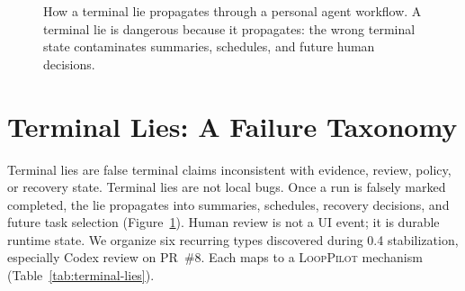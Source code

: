 \documentclass[11pt]{article}
\newcommand{\looppilot}{\textsc{LoopPilot}}
\begin{document}
\begin{figure}[t]
  \centering
  \caption{How a terminal lie propagates through a personal agent workflow.
  A terminal lie is dangerous because it propagates: the wrong terminal state contaminates summaries, schedules, and future human decisions.}
  \label{fig:lie-propagation}
\end{figure}

\section{Terminal Lies: A Failure Taxonomy}
\label{sec:taxonomy}

Terminal lies are false terminal claims inconsistent with evidence, review, policy, or recovery state.
Terminal lies are not local bugs.
Once a run is falsely marked completed, the lie propagates into summaries, schedules, recovery decisions, and future task selection (Figure~\ref{fig:lie-propagation}).
Human review is not a UI event; it is durable runtime state.
We organize six recurring types discovered during 0.4 stabilization, especially Codex review on PR~\#8.
Each maps to a \looppilot{} mechanism (Table~\ref{tab:terminal-lies}).
\end{document}
